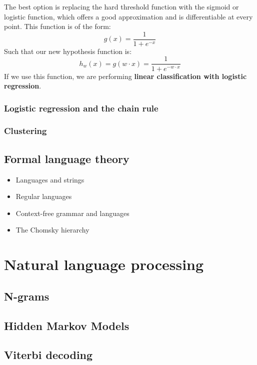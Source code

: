 The best option is replacing the hard threshold function with the
sigmoid or logistic function, which offers a good approximation and is
differentiable at every point. This function is of the form:
\begin{equation}
  g(x) = \frac{1}{1 + e^{-x}}
\end{equation}
Such that our new hypothesis function is:
\begin{equation}
  h_w(x) = g(w \cdot x) = \frac{1}{1 + e^{- w \cdot x}}
\end{equation}
If we use this function, we are performing \textbf{linear
  classification with logistic regression}.

\subsubsection{Logistic regression and the chain rule}
\subsubsection{Clustering}


\subsection{Formal language theory}
\label{sec:formalgrammars}
\begin{itemize}
\item Languages and strings
\item Regular languages
\item Context-free grammar and languages
\item The Chomsky hierarchy
\end{itemize}

\section{Natural language processing}
\label{sec:nlp}

\subsection{N-grams}
\label{sec:ngrams}

\subsection{Hidden Markov Models}
\label{sec:hmm-maxent}

\subsection{Viterbi decoding}
\label{sec:viterbi}

